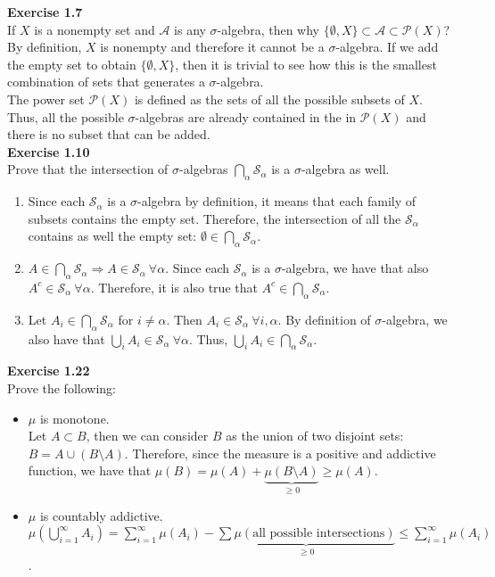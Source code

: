 \documentclass[letterpaper,12pt]{article}
\theoremstyle{definition}
\begin{document}
\noindent\textbf{Exercise 1.7}\\
If $X$ is a nonempty set and $\mathcal{A}$ is any $\sigma$-algebra, then why $\{\emptyset,X\}\subset\mathcal{A}\subset\mathcal{P}(X)$?\\
By definition, $X$ is nonempty and therefore it cannot be a $\sigma$-algebra. If we add the empty set to obtain $\{\emptyset,X\}$, then it is trivial to see how this is the smallest combination of sets that generates a $\sigma$-algebra. \\
The power set $\mathcal{P}(X)$ is defined as the sets of all the possible subsets of $X$. Thus, all the possible $\sigma$-algebras are already contained in the in $\mathcal{P}(X)$ and there is no subset that can be added.\\

\noindent\textbf{Exercise 1.10}\\
Prove that the intersection of $\sigma$-algebras $\bigcap_\alpha \mathcal{S}_\alpha$ is a $\sigma$-algebra as well.
\begin{enumerate}
\item Since each $\mathcal{S}_\alpha$ is a $\sigma$-algebra by definition, it means that each family of subsets contains the empty set. Therefore, the intersection of all the $\mathcal{S}_\alpha$ contains as well the empty set: $\emptyset\in\bigcap_\alpha \mathcal{S}_\alpha$.
\item $A\in\bigcap_\alpha \mathcal{S}_\alpha \Rightarrow A\in\mathcal{S}_\alpha ~\forall\alpha$. Since each $\mathcal{S}_\alpha$ is a $\sigma$-algebra, we have that also $A^c\in\mathcal{S}_\alpha ~\forall\alpha$. Therefore, it is also true that $A^c\in\bigcap_\alpha \mathcal{S}_\alpha$.
\item Let $A_i\in\bigcap_\alpha \mathcal{S}_\alpha$ for $i\neq\alpha$. Then $A_i\in\mathcal{S}_\alpha~ \forall i,\alpha$. By definition of $\sigma$-algebra, we also have that $\bigcup_i A_i\in\mathcal{S}_\alpha ~\forall\alpha$. Thus, $\bigcup_i A_i\in\bigcap_\alpha \mathcal{S}_\alpha$.
\end{enumerate}
\bigskip


\noindent\textbf{Exercise 1.22}\\
Prove the following:
\begin{itemize}
\item $\mu$ is monotone.\\ Let $A\subset B$, then we can consider $B$ as the union of two disjoint sets: $B=A \cup (B\setminus A)$. Therefore, since the measure is a positive and addictive function, we have that $\mu(B)=\mu(A)+\underbrace{\mu(B\setminus A)}_{\geq 0} \geq \mu(A).$ 
\item $\mu$ is countably addictive.\\ $\mu(\bigcup_{i=1}^{\infty} A_i) = \sum_{i=1}^{\infty} \mu(A_i) - \underbrace{\textstyle\sum \mu(\text{all possible intersections})}_{\geq 0} \leq \sum_{i=1}^{\infty} \mu(A_i)$.
\end{itemize}
\bigskip
\end{document}
